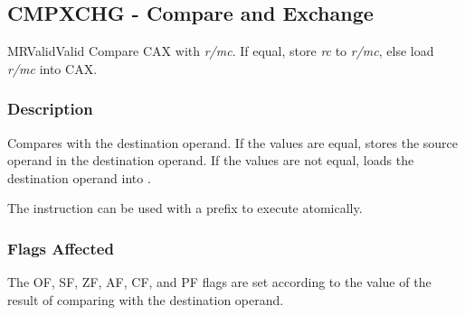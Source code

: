 \clearpage
{}
{}
\subsection*{CMPXCHG - Compare and Exchange}

\begin{x86opcodetable}
  {MR}{Valid}{Valid}
  {Compare CAX with \emph{r/mc}. If equal, store \emph{rc} to
    \emph{r/mc}, else load \emph{r/mc} into CAX.}
\end{x86opcodetable}

\begin{x86opentable}
\end{x86opentable}

\subsubsection*{Description}

Compares \CAX{} with the destination operand.  If the values are
equal, stores the source operand in the destination operand.  If the
values are not equal, loads the destination operand into \CAX{}.

The instruction can be used with a  prefix to execute
atomically.

\subsubsection*{Flags Affected}

The OF, SF, ZF, AF, CF, and PF flags are set according to the value of
the result of comparing \CAX{} with the destination operand.
